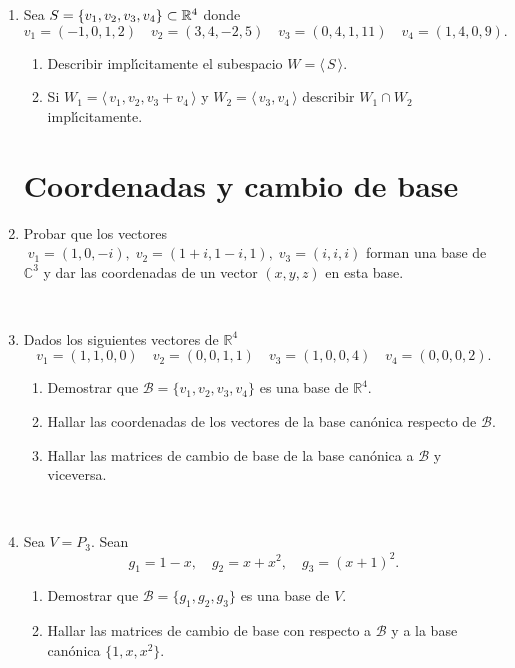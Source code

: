 \documentclass[11pt,spanish,makeidx]{amsbook}
\newcommand\R{\mathbb{R}}
\begin{document}
\begin{enumerate}
	\
	
	\item Sea  $S=\{v_1,v_2,v_3,v_4\}\subset\Bbb R^4$  donde
	$$
	v_1=(-1,0,1,2) \quad v_2=(3,4,-2,5) \quad v_3=(0,4,1,11) \quad
	v_4=(1,4,0,9).
	$$
	\begin{enumerate}
		\item  Describir impl{\'\i}citamente el subespacio  $W= \langle \, S\, \rangle$.
		\item Si $W_1 = \langle \, v_1,v_2,v_3+v_4\, \rangle $ y $W_2 = \langle \, v_3,v_4\, \rangle $
		describir $W_1\cap W_2$ impl{\'\i}citamente.
	\end{enumerate}
		
	
	
	
	\vspace{.5cm}
	
	\section*{Coordenadas y cambio de base}
	
	\vspace{.5cm}
	
	
	\item
	Probar que los vectores $\;v_1=(1,0,-i),\;
	v_2=(1+i,1-i,1),\;v_3=(i,i,i)$ forman una base de $\mathbb{C}^3$
	y dar las coordenadas de un vector $(x,y,z)$ en esta base.
		
	\
	
	\item Dados los siguientes vectores de $\R^4$
	$$
	v_1=(1,1,0,0) \quad v_2=(0,0,1,1) \quad v_3=(1,0,0,4)
	\quad v_4=(0,0,0,2).
	$$
	\begin{enumerate}
		\item Demostrar que
		$\mathcal{B}=\{v_1,v_2,v_3,v_4\}$ es una base de
		$\R ^4$.
		\item Hallar las coordenadas de los vectores de la
		base can\'onica respecto de $\mathcal{B}$.
		\item Hallar las matrices de cambio de base de la base can\'onica
		a $\mathcal{B}$ y viceversa.
	\end{enumerate}
		
	\
	
	\item  Sea $V=P_3$.
	Sean
	$$ g_1=1-x,\quad g_2=x+x^2, \quad g_3=(x+1)^2.$$
	\begin{enumerate}
		\item Demostrar que $\mathcal{B}=\{g_1,g_2,g_3\}$ es una base de $V$.
		\item Hallar las matrices de cambio de base con respecto a $\mathcal{B}$
		y a la base can{\'o}nica $\{1,x,x^2\}$.
	\end{enumerate}
		

\end{enumerate}
\end{document}
